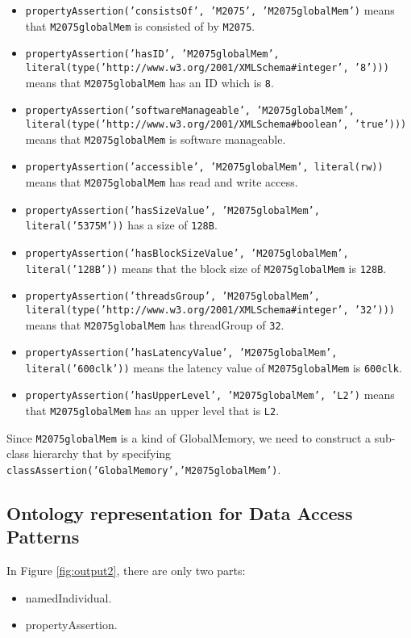 \documentclass{sig-alternate}
\begin{document}
\begin{itemize}
	\item \texttt{propertyAssertion('consistsOf', 'M2075', 'M2075globalMem')} means that \texttt{M2075globalMem} is consisted of by \texttt{M2075}.
	\item \texttt{propertyAssertion('hasID', 'M2075globalMem', literal(type('http://www.w3.org/2001/XMLSchema\#integer', '8')))} means that \texttt{M2075globalMem} has an ID which is \texttt{8}.
	\item \texttt{propertyAssertion('softwareManageable', 'M2075globalMem', literal(type('http://www.w3.org/2001/XMLSchema\#boolean', 'true')))} means that \texttt{M2075globalMem} is software manageable.
	\item \texttt{propertyAssertion('accessible', 'M2075globalMem', literal(rw))} means that \texttt{M2075globalMem} has read and write access.
	\item \texttt{propertyAssertion('hasSizeValue', 'M2075globalMem', literal('5375M'))} has a size of \texttt{128B}.
	\item \texttt{propertyAssertion('hasBlockSizeValue', 'M2075globalMem', literal('128B'))} means that the block size of \texttt{M2075globalMem} is \texttt{128B}.
	\item \texttt{propertyAssertion('threadsGroup', 'M2075globalMem', literal(type('http://www.w3.org/2001/XMLSchema\#integer', '32')))} means that \texttt{M2075globalMem} has threadGroup of \texttt{32}.
	\item \texttt{propertyAssertion('hasLatencyValue', 'M2075globalMem', literal('600clk'))} means the latency value of \texttt{M2075globalMem} is \texttt{600clk}.
	\item \texttt{propertyAssertion('hasUpperLevel', 'M2075globalMem', 'L2')} means that \texttt{M2075globalMem} has an upper level that is \texttt{L2}.
\end{itemize}

Since \texttt{M2075globalMem} is a kind of GlobalMemory, we need to construct a sub-class hierarchy that by specifying \texttt{classAssertion('GlobalMemory','M2075globalMem')}.

\subsection{Ontology representation for Data Access Patterns}

In Figure \ref{fig:output2}, there are only two parts:
\begin{itemize}
	\item namedIndividual. 
	\item propertyAssertion. 
\end{itemize}
\end{document}
